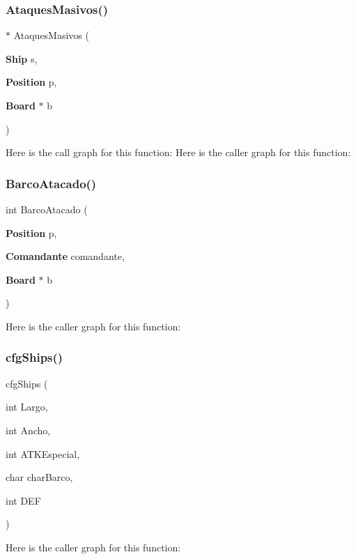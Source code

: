 \subsubsection{Ataques\+Masivos()}
{\footnotesize{}$\ast$ Ataques\+Masivos (\begin{DoxyParamCaption}\item[{{\bf Ship}}]{s,  }\item[{{\bf Position}}]{p,  }\item[{{\bf Board} $\ast$}]{b }\end{DoxyParamCaption})}

Here is the call graph for this function\+:
Here is the caller graph for this function\+:
\label{funciones_8c_a239d2a4d17c05ed3c75c7355fe010abb} 
\subsubsection{Barco\+Atacado()}
{\footnotesize\ttfamily int Barco\+Atacado (\begin{DoxyParamCaption}\item[{{\bf Position}}]{p,  }\item[{{\bf Comandante}}]{comandante,  }\item[{{\bf Board} $\ast$}]{b }\end{DoxyParamCaption})}

Here is the caller graph for this function\+:
\label{funciones_8c_a3ff7ba459575ce6387fc046876832c56} 
\subsubsection{cfg\+Ships()}
{\footnotesize{} cfg\+Ships (\begin{DoxyParamCaption}\item[{int}]{Largo,  }\item[{int}]{Ancho,  }\item[{int}]{A\+T\+K\+Especial,  }\item[{char}]{char\+Barco,  }\item[{int}]{D\+EF }\end{DoxyParamCaption})}

Here is the caller graph for this function\+:
\label{funciones_8c_a2ba9e38caf8780cd911190db47e91981} 
